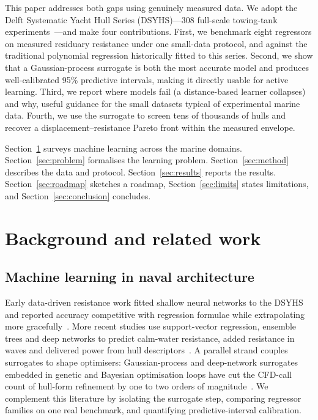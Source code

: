 \documentclass[pdflatex,sn-mathphys-num]{sn-jnl}%
\theoremstyle{thmstyleone}%
\theoremstyle{thmstyletwo}%
\theoremstyle{thmstylethree}%
\begin{document}
This paper addresses both gaps using genuinely measured data. We adopt the Delft
Systematic Yacht Hull Series (DSYHS)---308 full-scale towing-tank
experiments~\cite{gerritsma1981,uci}---and make four contributions. First, we
benchmark eight regressors on measured residuary resistance under one small-data
protocol, and against the traditional polynomial regression historically fitted
to this series. Second, we show that a Gaussian-process surrogate is both the
most accurate model and produces well-calibrated 95\% predictive intervals,
making it directly usable for active learning. Third, we report where models fail
(a distance-based learner collapses) and why, useful guidance for the small
datasets typical of experimental marine data. Fourth, we use the surrogate to
screen tens of thousands of hulls and recover a displacement--resistance Pareto
front within the measured envelope.

Section~\ref{sec:related} surveys machine learning across the marine domains.
Section~\ref{sec:problem} formalises the learning problem.
Section~\ref{sec:method} describes the data and protocol.
Section~\ref{sec:results} reports the results. Section~\ref{sec:roadmap} sketches
a roadmap, Section~\ref{sec:limits} states limitations, and
Section~\ref{sec:conclusion} concludes.

\section{Background and related work}\label{sec:related}

\subsection{Machine learning in naval architecture}\label{subsec:na}
Early data-driven resistance work fitted shallow neural networks to the DSYHS and
reported accuracy competitive with regression formulae while extrapolating more
gracefully~\cite{ortigosa2009}. More recent studies use support-vector
regression, ensemble trees and deep networks to predict calm-water resistance,
added resistance in waves and delivered power from hull
descriptors~\cite{cepowski2020,ao2021,kim2020}. A parallel strand couples
surrogates to shape optimisers: Gaussian-process and deep-network surrogates
embedded in genetic and Bayesian optimisation loops have cut the CFD-call count
of hull-form refinement by one to two orders of
magnitude~\cite{marlantes2023,liu2022,serani2016}. We complement this literature
by isolating the surrogate step, comparing regressor families on one real
benchmark, and quantifying predictive-interval calibration.
\end{document}
